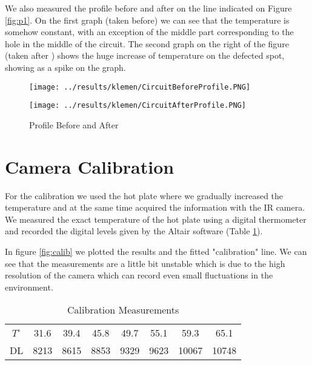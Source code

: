\documentclass{article}
\begin{document}
We also measured the profile before and after on the line 
indicated on Figure \ref{fig:p1}. On the first graph (taken 
before) we can see that the temperature is somehow constant, 
with an exception of the middle part corresponding to the hole in 
the middle of the circuit. The second graph on the right of 
the figure (taken after
) shows the huge increase of temperature on the defected spot, 
showing as a spike on the graph. 

\begin{figure}[H]
\centering
\begin{minipage}[b]{0.48\linewidth}
\texttt{[image: ../results/klemen/CircuitBeforeProfile.PNG]}
\end{minipage}
\quad
\begin{minipage}[b]{0.48\linewidth}
\texttt{[image: ../results/klemen/CircuitAfterProfile.PNG]}
\end{minipage}
\caption{Profile Before and After}
\label{fig:p1b}
\end{figure}



\section{Camera Calibration}


For the calibration we used the hot plate where we gradually increased the 
temperature and at the same time acquired the information with the IR camera.
We measured the exact temperature of the hot plate using a digital thermometer
and recorded the digital levels given by the Altair software (Table \ref{tb:calib}).

In figure \ref{fig:calib} we plotted the results and the fitted "calibration" 
line. We can see that the measurements are a little bit unstable which is due to the 
high resolution of the camera which can record even small fluctuations in
the environment. 

\begin{table}[H]
\centering
\begin{tabular}{|c|c|c|c|c|c|c|c|}
\hline
$T^\circ$ & 31.6 & 39.4 & 45.8 & 49.7 & 55.1 & 59.3 & 65.1 \\
DL& 8213 & 8615 & 8853 & 9329 & 9623 & 10067 & 10748 \\ 
\hline
\end{tabular}
\caption{Calibration Measurements}
\label{tb:calib}
\end{table}
\end{document}
